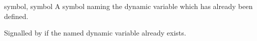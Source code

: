 \begin{optDefinition}
%
\begin{initoptions}
    \item[symbol, symbol] A symbol naming the dynamic variable which has already
    been defined.
\end{initoptions}
%
\remarks%
Signalled by  if the named dynamic variable already
exists.
\end{optDefinition}
